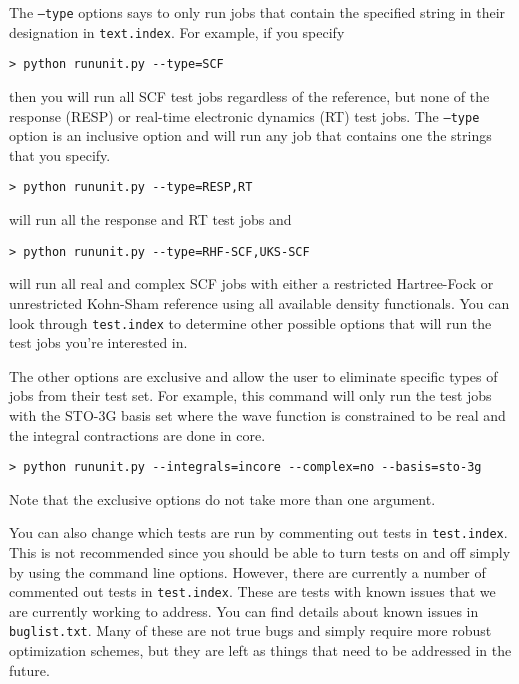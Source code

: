 \documentclass[12pt]{article}
\begin{document}
   The \texttt{--type} options says to only run jobs that contain the specified string in their 
   designation in \texttt{text.index}. For example, if you specify 
  \begin{lstlisting}
> python rununit.py --type=SCF
   \end{lstlisting}
    \noindent then you will run all SCF test jobs regardless of the reference, but none of the response (RESP)
    or real-time electronic dynamics (RT) test jobs. The \texttt{--type} option is an inclusive option and will run
    any job that contains one the strings that you specify. 
    \begin{lstlisting}
> python rununit.py --type=RESP,RT
   \end{lstlisting}
    \noindent will run all the response and RT test jobs and 
   \begin{lstlisting}
> python rununit.py --type=RHF-SCF,UKS-SCF
   \end{lstlisting}
    \noindent will run all real and complex SCF jobs with either a restricted Hartree-Fock or unrestricted Kohn-Sham
    reference using all available density functionals. You can look through \texttt{test.index} to determine other possible options
    that will run the test jobs you're interested in. 
        
    The other options are exclusive and allow the user to eliminate specific types of jobs from their test set. 
    For example, this command will only run the test jobs with the STO-3G basis set where the wave function 
    is constrained to be real and the integral contractions are done in core. 
    \begin{lstlisting}
> python rununit.py --integrals=incore --complex=no --basis=sto-3g
   \end{lstlisting}
    \noindent Note that the exclusive options do not take more than one argument. 
    
     You can also change which tests are run by commenting out tests in \texttt{test.index}. This is 
    not recommended since you should be able to turn tests on and off simply by using the command line
    options. However, there are currently a number of commented out tests in \texttt{test.index}. These are
    tests with known issues that we are currently working to address. You can find details about known issues
    in \texttt{buglist.txt}. Many of these are not true bugs and simply require more robust optimization schemes, 
    but they are left as things that need to be addressed in the future. 
    
\end{document}
